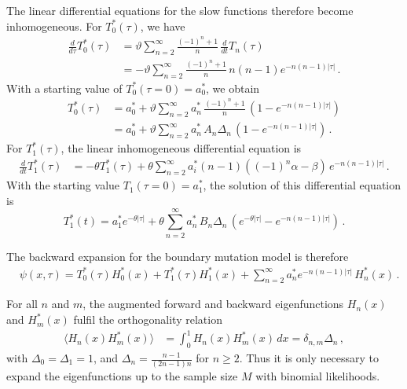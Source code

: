 \documentclass[preprint]{elsarticle}
\begin{document}
The linear differential equations for the slow functions therefore become inhomogeneous.
For $T_0^{*}(\tau)$, we have
\begin{equation}
\begin{split}
    \frac{d}{d\tau} T_0^{*}(\tau)&=\vartheta\sum_{n=2}^\infty \frac{(-1)^n+1}{n}\,\frac{d}{dt} T_n(\tau)\\
    &=-\vartheta\sum_{n=2}^\infty \frac{(-1)^n+1}{n}\,n(n-1)e^{-n(n-1) |\tau|}\,.
\end{split}
\end{equation}
With a starting value of $T_0^{*}(\tau=0)=a_0^{*}$, we obtain
\begin{equation}
\begin{split}
    T_0^{*}(\tau)&=a_0^{*}+\vartheta\sum_{n=2}^\infty a_n^{*}\,\frac{(-1)^n+1}{n}\, (1- e^{-n(n-1) |\tau|})\\
        &=a_0^{*}+\vartheta\sum_{n=2}^\infty a_n^{*}\,A_n\Delta_n\, (1- e^{-n(n-1) |\tau|})\,.
\end{split}
\end{equation}
For $T_1^{*}(\tau)$, the linear inhomogeneous differential equation is 
\begin{equation}
\begin{split}
    \frac{d}{dt} T_1^{*}(\tau)&=-\theta T_1^{*} (\tau)
    +\theta\sum_{n=2}^\infty a_i^{*} (n-1)((-1)^n\alpha-\beta)\,e^{-n(n-1) |\tau|} \,.
\end{split}
\end{equation}
With the starting value $T_1(\tau=0)=a_1^{*}$, the solution of this differential equation is
\begin{equation}
    T_1^{*}(t)=a_1^{*} e^{-\theta |\tau|} 
    +\theta\sum_{n=2}^\infty a_n^{*}\,B_n\Delta_n\,  (e^{-\theta |\tau|}- e^{-n(n-1) |\tau|}) \,.
\end{equation}

The backward expansion for the boundary mutation model is therefore
\begin{equation}\label{eq:backw_expansion_boundary}
\begin{split}
    &\psi(x,\tau)=T_0^{*}(\tau)H_0^{*}(x)+ T_1^{*}(\tau)H_1^{*}(x)+\sum_{n=2}^\infty a_n^{*} e^{-n(n-1) |\tau|}\,H_n^{*}(x)\,.
\end{split}
\end{equation}

For all $n$ and $m$, the augmented forward and backward eigenfunctions $H_n(x)$ and $H_m^{*}(x)$ fulfil the orthogonality relation 
\begin{equation}
\begin{split}
    \langle H_n(x)H_m^{*}(x)\rangle&= \int_0^1 H_n(x)H_m^{*}(x)\,dx=\delta_{n,m}\Delta_n\,,
\end{split}
\end{equation}
with $\Delta_0=\Delta_1=1$, and $\Delta_n=\frac{n-1}{(2n-1)n}$ for $n\geq 2$. Thus it is only necessary to expand the eigenfunctions up to the sample size $M$ with binomial likelihoods. 
\end{document}
